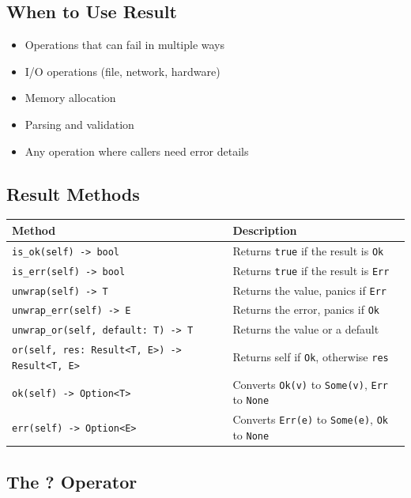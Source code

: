 \subsection{When to Use Result}

\begin{itemize}
    \item Operations that can fail in multiple ways
    \item I/O operations (file, network, hardware)
    \item Memory allocation
    \item Parsing and validation
    \item Any operation where callers need error details
\end{itemize}

\subsection{Result Methods}

\begin{center}
\begin{tabular}{lp{8cm}}
\textbf{Method} & \textbf{Description} \\
\hline
\texttt{is\_ok(self) -> bool} & Returns \texttt{true} if the result is \texttt{Ok} \\
\texttt{is\_err(self) -> bool} & Returns \texttt{true} if the result is \texttt{Err} \\
\texttt{unwrap(self) -> T} & Returns the value, panics if \texttt{Err} \\
\texttt{unwrap\_err(self) -> E} & Returns the error, panics if \texttt{Ok} \\
\texttt{unwrap\_or(self, default: T) -> T} & Returns the value or a default \\
\texttt{or(self, res: Result<T, E>) -> Result<T, E>} & Returns self if \texttt{Ok}, otherwise \texttt{res} \\
\texttt{ok(self) -> Option<T>} & Converts \texttt{Ok(v)} to \texttt{Some(v)}, \texttt{Err} to \texttt{None} \\
\texttt{err(self) -> Option<E>} & Converts \texttt{Err(e)} to \texttt{Some(e)}, \texttt{Ok} to \texttt{None} \\
\end{tabular}
\end{center}

\subsection{The ? Operator}

